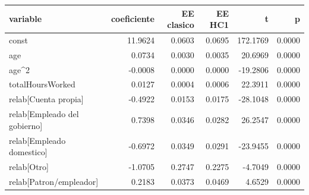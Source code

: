 \begin{tabular}{lrrrrr}
\toprule
variable & coeficiente & EE clasico & EE HC1 & t & p \\
\midrule
const & 11.9624 & 0.0603 & 0.0695 & 172.1769 & 0.0000 \\
age & 0.0734 & 0.0030 & 0.0035 & 20.6969 & 0.0000 \\
age\textasciicircum 2 & -0.0008 & 0.0000 & 0.0000 & -19.2806 & 0.0000 \\
totalHoursWorked & 0.0127 & 0.0004 & 0.0006 & 22.3911 & 0.0000 \\
relab[Cuenta propia] & -0.4922 & 0.0153 & 0.0175 & -28.1048 & 0.0000 \\
relab[Empleado del gobierno] & 0.7398 & 0.0346 & 0.0282 & 26.2547 & 0.0000 \\
relab[Empleado domestico] & -0.6972 & 0.0349 & 0.0291 & -23.9455 & 0.0000 \\
relab[Otro] & -1.0705 & 0.2747 & 0.2275 & -4.7049 & 0.0000 \\
relab[Patron/empleador] & 0.2183 & 0.0373 & 0.0469 & 4.6529 & 0.0000 \\
\bottomrule
\end{tabular}
